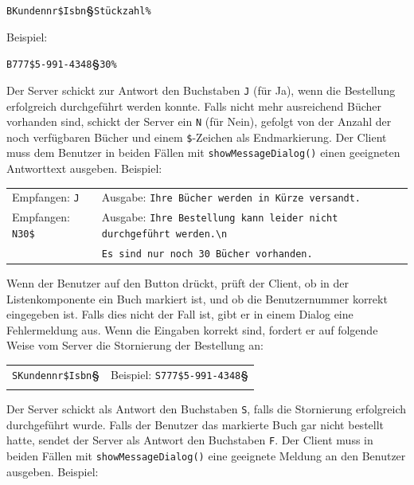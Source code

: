 \lstinline|BKundennr$Isbn|\textbf{§}\lstinline|Stückzahl%|

Beispiel: 

\lstinline|B777$5-991-4348|\textbf{§}\lstinline|30%|

Der Server schickt zur Antwort den Buchstaben \lstinline|J| (für Ja), wenn die
Bestellung erfolgreich durchgeführt werden konnte. Falls nicht mehr ausreichend
Bücher vorhanden sind, schickt der Server ein \lstinline|N| (für Nein), gefolgt
von der Anzahl der noch verfügbaren Bücher und einem \lstinline|$|-Zeichen als
Endmarkierung. Der Client muss dem Benutzer in beiden Fällen mit
\lstinline|showMessageDialog()| einen geeigneten Antworttext ausgeben. Beispiel:

\bgroup
\def\arraystretch{1.2}
\begin{tabularx}{\textwidth}{p{30mm} X}
Empfangen: \lstinline|J| &
Ausgabe: \lstinline|Ihre Bücher werden in Kürze versandt.| \\
Empfangen: \lstinline|N30$| &
Ausgabe: \lstinline|Ihre Bestellung kann leider nicht durchgeführt werden.\n|
\\
& \hspace{15mm}\lstinline|Es sind nur noch 30 Bücher vorhanden.|
\\
\end{tabularx}
\egroup

Wenn der Benutzer auf den Button  drückt, prüft der Client, ob in der Listenkomponente ein Buch
markiert ist, und ob die Benutzernummer korrekt eingegeben ist. Falls dies
nicht der Fall ist, gibt er in einem Dialog eine Fehlermeldung aus. Wenn die
Eingaben korrekt sind, fordert er auf folgende Weise vom Server die Stornierung
der Bestellung an:

\bgroup
\def\arraystretch{1.2}
\begin{tabularx}{\textwidth}{p{30mm} X}
\lstinline|SKundennr$Isbn|\textbf{§} &
Beispiel: \lstinline|S777$5-991-4348|\textbf{§} \\
\\
\end{tabularx}
\egroup

Der Server schickt als Antwort den Buchstaben \lstinline|S|, falls die
Stornierung erfolgreich durchgeführt wurde. Falls der Benutzer das markierte
Buch gar nicht bestellt hatte, sendet der Server als Antwort den Buchstaben
\lstinline|F|. Der Client muss in beiden Fällen mit
\lstinline|showMessageDialog()| eine geeignete Meldung an den Benutzer ausgeben.
Beispiel:

